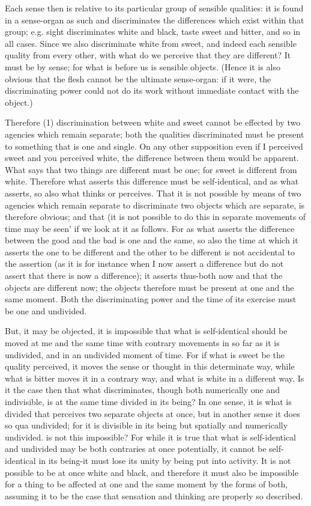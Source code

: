 Each sense then is relative to its particular group of sensible qualities:
it is found in a sense-organ as such and discriminates the differences
which exist within that group; e.g. sight discriminates white and
black, taste sweet and bitter, and so in all cases. Since we also
discriminate white from sweet, and indeed each sensible quality from
every other, with what do we perceive that they are different? It
must be by sense; for what is before us is sensible objects. (Hence
it is also obvious that the flesh cannot be the ultimate sense-organ:
if it were, the discriminating power could not do its work without
immediate contact with the object.) 

Therefore (1) discrimination between white and sweet cannot be effected
by two agencies which remain separate; both the qualities discriminated
must be present to something that is one and single. On any other
supposition even if I perceived sweet and you perceived white, the
difference between them would be apparent. What says that two things
are different must be one; for sweet is different from white. Therefore
what asserts this difference must be self-identical, and as what asserts,
so also what thinks or perceives. That it is not possible by means
of two agencies which remain separate to discriminate two objects
which are separate, is therefore obvious; and that (it is not possible
to do this in separate movements of time may be seen' if we look at
it as follows. For as what asserts the difference between the good
and the bad is one and the same, so also the time at which it asserts
the one to be different and the other to be different is not accidental
to the assertion (as it is for instance when I now assert a difference
but do not assert that there is now a difference); it asserts thus-both
now and that the objects are different now; the objects therefore
must be present at one and the same moment. Both the discriminating
power and the time of its exercise must be one and undivided.

But, it may be objected, it is impossible that what is self-identical
should be moved at me and the same time with contrary movements in
so far as it is undivided, and in an undivided moment of time. For
if what is sweet be the quality perceived, it moves the sense or thought
in this determinate way, while what is bitter moves it in a contrary
way, and what is white in a different way. Is it the case then that
what discriminates, though both numerically one and indivisible, is
at the same time divided in its being? In one sense, it is what is
divided that perceives two separate objects at once, but in another
sense it does so qua undivided; for it is divisible in its being but
spatially and numerically undivided. is not this impossible? For while
it is true that what is self-identical and undivided may be both contraries
at once potentially, it cannot be self-identical in its being-it must
lose its unity by being put into activity. It is not possible to be
at once white and black, and therefore it must also be impossible
for a thing to be affected at one and the same moment by the forms
of both, assuming it to be the case that sensation and thinking are
properly so described. 

